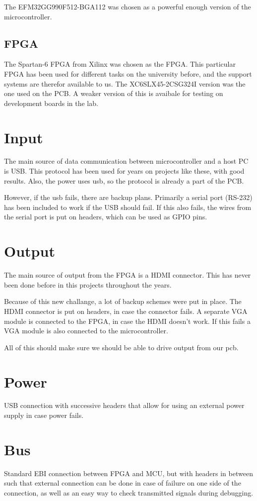 The EFM32GG990F512-BGA112 was chosen as a powerful enough version of the microcontroller.

\subsection{FPGA}
The Spartan-6 FPGA from Xilinx was chosen as the FPGA.
This particular FPGA has been used for different tasks on the university before, and the support systems are therefor available to us.
The XC6SLX45-2CSG324I version was the one used on the PCB.
A weaker version of this is avaibale for testing on development boards in the lab.

\section{Input}

The main source of data communication between microcontroller and a host PC is USB.
This protocol has been used for years on projects like these, with good results. 
Also, the power uses usb, so the protocol is already a part of the PCB.

However, if the usb fails, there are backup plans.
Primarily a serial port (RS-232) has been included to work if the USB should fail.
If this also fails, the wires from the serial port is put on headers, which can be used as GPIO pins.

\section{Output}
The main source of output from the FPGA is a HDMI connector.
This has never been done before in this projects throughout the years.

Because of this new challange, a lot of backup schemes were put in place.
The HDMI connector is put on headers, in case the connector fails.
A separate VGA module is connected to the FPGA, in case the HDMI doesn't work.
If this fails a VGA module is also connected to the microcontroller.

All of this should make sure we should be able to drive output from our pcb.

\section{Power}
USB connection with successive headers that allow for using an external power supply in case power fails.

\section{Bus}
Standard EBI connection between FPGA and MCU, but with headers in between such that external connection can be done in case of failure on one side of the connection, as well as an easy way to check transmitted signals during debugging.

